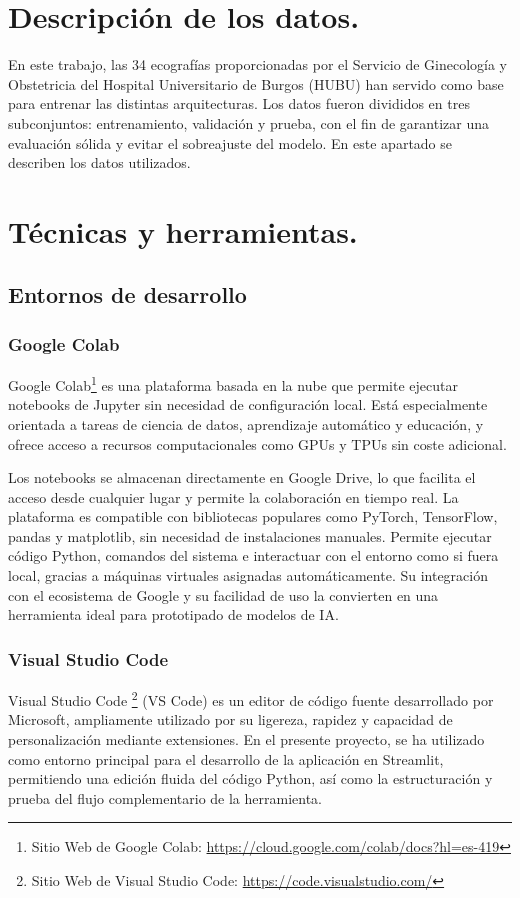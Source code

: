 
\section{Descripción de los datos.}
En este trabajo, las 34 ecografías proporcionadas por el Servicio de Ginecología y Obstetricia del Hospital Universitario de Burgos (HUBU) han servido como base para entrenar las distintas arquitecturas. Los datos fueron divididos en tres subconjuntos: entrenamiento, validación y prueba, con el fin de garantizar una evaluación sólida y evitar el sobreajuste del modelo. En este apartado se describen los datos utilizados.
 
\section{Técnicas y herramientas.}
\subsection{Entornos de desarrollo}
\subsubsection{Google Colab}
Google Colab\footnote{Sitio Web de Google Colab: \url{https://cloud.google.com/colab/docs?hl=es-419}} es una plataforma basada en la nube que permite ejecutar notebooks de Jupyter sin necesidad de configuración local. Está especialmente orientada a tareas de ciencia de datos, aprendizaje automático y educación, y ofrece acceso a recursos computacionales como GPUs y TPUs sin coste adicional. 

Los notebooks se almacenan directamente en Google Drive, lo que facilita el acceso desde cualquier lugar y permite la colaboración en tiempo real.
La plataforma es compatible con bibliotecas populares como PyTorch, TensorFlow, pandas y matplotlib, sin necesidad de instalaciones manuales. Permite ejecutar código Python, comandos del sistema e interactuar con el entorno como si fuera local, gracias a máquinas virtuales asignadas automáticamente. Su integración con el ecosistema de Google y su facilidad de uso la convierten en una herramienta ideal para prototipado de modelos de IA.
\subsubsection{Visual Studio Code}
Visual Studio Code \footnote{Sitio Web de Visual Studio Code: \url{https://code.visualstudio.com/}} (VS Code) es un editor de código fuente desarrollado por Microsoft, ampliamente utilizado por su ligereza, rapidez y capacidad de personalización mediante extensiones. En el presente proyecto, se ha utilizado como entorno principal para el desarrollo de la aplicación en Streamlit, permitiendo una edición fluida del código Python, así como la estructuración y prueba del flujo complementario de la herramienta.

